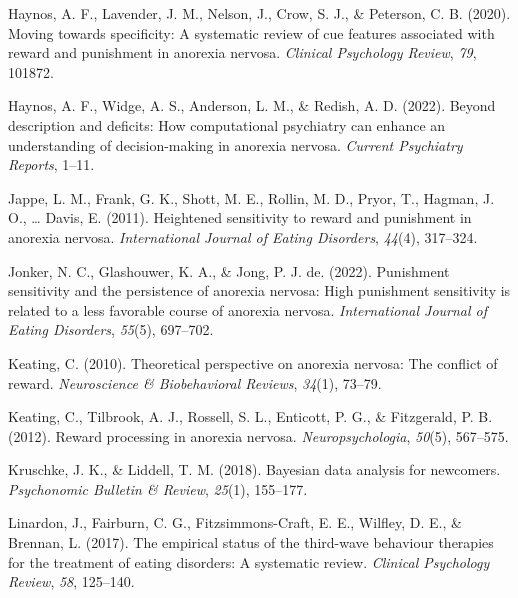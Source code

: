 \documentclass[
  man,floatsintext]{apa6}
\newlength{\cslhangindent}
\newlength{\cslentryspacingunit} %
\newenvironment{CSLReferences}[2] %
 {%
  \setlength{\parindent}{0pt}
  \ifodd #1
  \let\oldpar\par
  \def\par{\hangindent=\cslhangindent\oldpar}
  \fi
  \setlength{\parskip}{#2\cslentryspacingunit}
 }%
 {}
\begin{document}
\begin{CSLReferences}{1}{0}
\leavevmode{}%
Haynos, A. F., Lavender, J. M., Nelson, J., Crow, S. J., \& Peterson, C. B. (2020). Moving towards specificity: A systematic review of cue features associated with reward and punishment in anorexia nervosa. \emph{Clinical Psychology Review}, \emph{79}, 101872.

\leavevmode{}%
Haynos, A. F., Widge, A. S., Anderson, L. M., \& Redish, A. D. (2022). Beyond description and deficits: How computational psychiatry can enhance an understanding of decision-making in anorexia nervosa. \emph{Current Psychiatry Reports}, 1--11.

\leavevmode{}%
Jappe, L. M., Frank, G. K., Shott, M. E., Rollin, M. D., Pryor, T., Hagman, J. O., \ldots{} Davis, E. (2011). Heightened sensitivity to reward and punishment in anorexia nervosa. \emph{International Journal of Eating Disorders}, \emph{44}(4), 317--324.

\leavevmode{}%
Jonker, N. C., Glashouwer, K. A., \& Jong, P. J. de. (2022). Punishment sensitivity and the persistence of anorexia nervosa: High punishment sensitivity is related to a less favorable course of anorexia nervosa. \emph{International Journal of Eating Disorders}, \emph{55}(5), 697--702.

\leavevmode{}%
Keating, C. (2010). Theoretical perspective on anorexia nervosa: The conflict of reward. \emph{Neuroscience \& Biobehavioral Reviews}, \emph{34}(1), 73--79.

\leavevmode{}%
Keating, C., Tilbrook, A. J., Rossell, S. L., Enticott, P. G., \& Fitzgerald, P. B. (2012). Reward processing in anorexia nervosa. \emph{Neuropsychologia}, \emph{50}(5), 567--575.

\leavevmode{}%
Kruschke, J. K., \& Liddell, T. M. (2018). Bayesian data analysis for newcomers. \emph{Psychonomic Bulletin \& Review}, \emph{25}(1), 155--177.

\leavevmode{}%
Linardon, J., Fairburn, C. G., Fitzsimmons-Craft, E. E., Wilfley, D. E., \& Brennan, L. (2017). The empirical status of the third-wave behaviour therapies for the treatment of eating disorders: A systematic review. \emph{Clinical Psychology Review}, \emph{58}, 125--140.


\end{CSLReferences}
\end{document}
